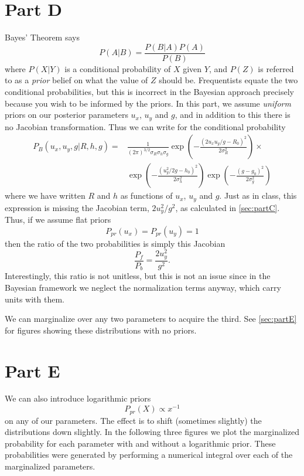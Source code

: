 \documentclass[12pt,a4paper]{article}
\begin{document}
\section{Part D}
\label{sec:partD}
Bayes' Theorem says
\begin{equation}
  P(A|B) = \frac{P(B|A)P(A)}{P(B)}
\end{equation}
where $P(X|Y)$ is a conditional probability of $X$ given $Y$, and $P(Z)$ is 
referred to as a \textit{prior} belief on what the value of $Z$ should be.
Frequentists equate the two conditional probabilities, but this is incorrect
in the Bayesian approach precisely because you wish to be informed by the 
priors. In this part, we assume \textit{uniform} priors on our posterior
parameters $u_x$, $u_y$ and $g$, and in addition to this there is no Jacobian 
transformation. Thus we can write for the conditional probability
\begin{align}
  \label{eq:bayesian_conditional}
  P_B(u_x,u_y,g|R,h,g) = & \frac{1}{(2\pi)^{3/2}\sigma_R\sigma_h\sigma_g} \exp\left(-\frac{(2u_xu_y/g - R_0)^2}{2\sigma_R^2}\right)\times \\ &\exp\left(-\frac{(u_y^2/2g-h_0)^2}{2\sigma_h^2}\right) \exp\left(-\frac{(g-g_0)^2}{2\sigma_g^2}\right)
\end{align}
where we have written $R$ and $h$ as functions of $u_x$, $u_y$ and $g$. Just as in class,
this expression is missing the Jacobian term,
$2u_y^2/g^2$, as calculated in \autoref{sec:partC}. Thus, if we assume flat priors
\begin{equation}
  \label{eq:priors_partD}
  P_{pr}(u_x) = P_{pr}(u_y) = 1
\end{equation}
then the ratio of the two probabilities is simply this Jacobian
\begin{equation}
  \label{eq:prob_ratio}
  \frac{P_f}{P_b} = \frac{2u_y^2}{g^2}.
\end{equation}
Interestingly, this ratio is not unitless, 
but this is not an issue since in the Bayesian 
framework we neglect the normalization terms anyway, 
which carry units with them.

We can marginalize over any two parameters to acquire the third.
See \autoref{sec:partE} for figures showing these distributions 
with no priors.

\section{Part E}
We can also introduce logarithmic priors
\begin{equation*}
  \label{eq:log_prior}
  P_{pr}(X) \propto x^{-1}
\end{equation*}
on any of our parameters. The effect is to shift (sometimes slightly)
the distributions down slightly. In the following three figures
we plot the marginalized probability for each parameter with and 
without a logarithmic prior. These probabilities were generated
by performing a numerical integral over each of the marginalized
parameters.
\end{document}

